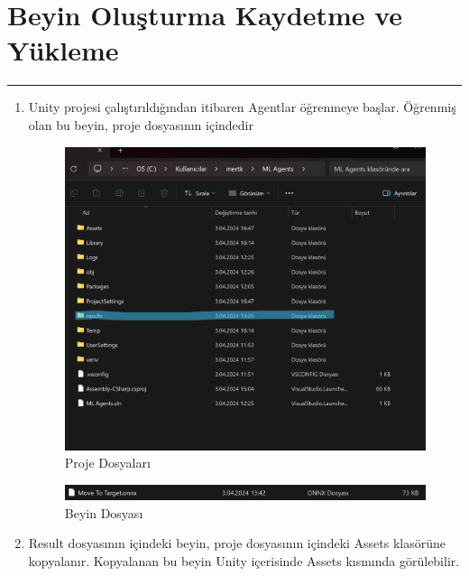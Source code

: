\documentclass{article}
\begin{document}
\vspace{1cm}

\newpage

\section{Beyin Oluşturma Kaydetme ve Yükleme}
\rule{\textwidth}{0.5pt}
\begin{enumerate}
\item  Unity projesi çalıştırıldığından itibaren Agentlar öğrenmeye başlar. Öğrenmiş olan bu beyin, proje dosyasının içindedir\\[5pt]

\begin{figure}[h]
  \centering
  \includegraphics[width=1\textwidth]{results.png}
  \caption{Proje Dosyaları}
\end{figure}

\vspace{1cm}

\begin{figure}[h]
  \centering
  \includegraphics[width=1\textwidth]{beyin.png}
  \caption{Beyin Dosyası}
\end{figure}

\newpage

\item Result dosyasının içindeki beyin, proje dosyasının içindeki Assets klasörüne kopyalanır. Kopyalanan bu beyin Unity içerisinde Assets kısmında görülebilir.


\end{enumerate}
\end{document}
